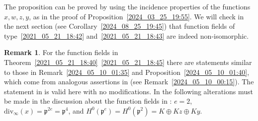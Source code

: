 \documentclass[12pt,reqno]{amsart}
\theoremstyle{definition}
\newtheorem{rem}[thm]{Remark}
\newcommand{\pp}{\mathfrak{p}}
\begin{document}
The proposition can be proved by using the incidence properties of the functions $x,w,z,y$, as in the proof of Proposition~\ref{2024_03_25_19:55}. 
We will check in the next section (see Corollary~\ref{2024_08_25_19:45}) that function fields of type~\ref{2021_05_21_18:42} and~\ref{2021_05_21_18:43} are indeed non-isomorphic.

\begin{rem}\label{2024_05_10_20:05}
For the function fields in Theorem~\ref{2021_05_21_18:40}~\ref{2021_05_21_18:45} there are statements similar to those in Remark~\ref{2024_05_10_01:35} and Proposition~\ref{2024_05_10_01:40}, which come from analogous assertions in \cite[Remark~3.4 and Proposition~3.5]{HiSt23} (see Remark~\ref{2024_05_10_00:15}). 
The statement in \cite[Proposition~3.5~(ii)]{HiSt23} is valid here with no modifications.
In \cite[Remark~3.4]{HiSt23} the following alterations must be made in the discussion about the function fields in \cite[Theorem~3.1~(ii)]{HiSt23}: $e=2$, $\mathrm{div}_\infty(x) = \pp^{2e} = \pp^4$, and $H^0(\pp^e) = H^0(\pp^2) = K \oplus Kz \oplus Ky$.
\end{rem}
\end{document}
